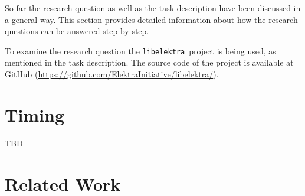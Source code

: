 \documentclass[a4paper]{article}
\newcommand{\libelektra}{\texttt{libelektra}~}
\begin{document}
So far the research question as well as the task description have been discussed in a general way.
This section provides detailed information about how the research questions can be answered step by step.

To examine the research question the \libelektra project is being used, as mentioned in the task description.
The source code of the project is available at GitHub (\url{https://github.com/ElektraInitiative/libelektra/}).



\section{Timing}
TBD
  

\section{Related Work}

\begingroup
\renewcommand{\section}[2]{}
\renewcommand{\refname}{}
\nocite{*}


\endgroup
\end{document}

